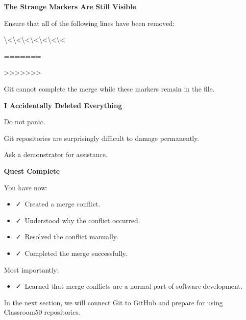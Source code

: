 \documentclass{csc2059practical}
\begin{document}
\begin{commonerror}
\textbf{The Strange Markers Are Still Visible}\par
\medskip

Ensure that all of the following lines have been removed:


\textbackslash{}<\textbackslash{}<\textbackslash{}<\textbackslash{}<\textbackslash{}<\textbackslash{}<\textbackslash{}<


\begin{terminalplain}
  =======
\end{terminalplain}
>>>>>>>

Git cannot complete the merge while these markers remain in the file.
\end{commonerror}

\begin{commonerror}
\textbf{I Accidentally Deleted Everything}\par
\medskip

Do not panic.


Git repositories are surprisingly difficult to damage permanently.


Ask a demonstrator for assistance.


\end{commonerror}
\begin{wrapupbox}
\textbf{Quest Complete}\par
\medskip

You have now:


\begin{itemize}
  \item \faCheck\ Created a merge conflict.
\end{itemize}

\begin{itemize}
  \item \faCheck\ Understood why the conflict occurred.
\end{itemize}

\begin{itemize}
  \item \faCheck\ Resolved the conflict manually.
\end{itemize}

\begin{itemize}
  \item \faCheck\ Completed the merge successfully.
\end{itemize}

Most importantly:


\begin{itemize}
  \item \faCheck\ Learned that merge conflicts are a normal part of software development.
\end{itemize}

In the next section, we will connect Git to GitHub and prepare for using Classroom50 repositories.


\end{wrapupbox}
\end{document}
